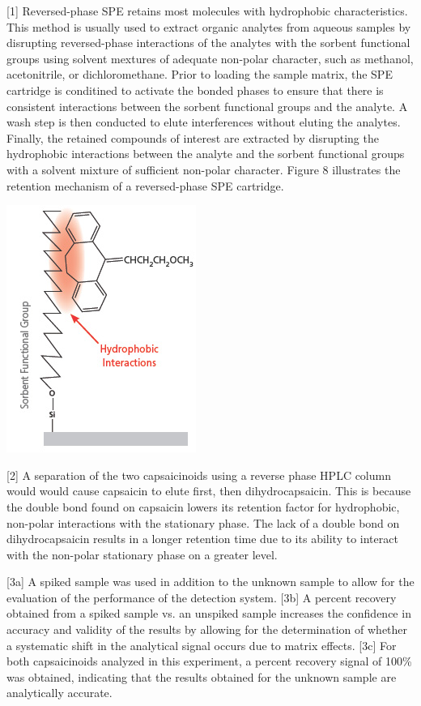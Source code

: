 \documentclass{article}
\begin{document}
\begin{multicols}{2}
{[1] Reversed-phase SPE retains most molecules with hydrophobic characteristics.
This method is usually used to extract organic analytes from aqueous samples by
disrupting reversed-phase interactions of the analytes with the sorbent
functional groups using solvent mextures of adequate non-polar character, such
as methanol, acetonitrile, or dichloromethane.  Prior to loading the sample
matrix, the SPE cartridge is conditined to activate the bonded phases to ensure
that there is consistent interactions between the sorbent functional groups and
the analyte. A wash step is then conducted to elute interferences without
eluting the analytes. Finally, the retained compounds of interest are extracted
by disrupting the hydrophobic interactions between the analyte and the sorbent
functional groups with a solvent mixture of sufficient non-polar character.
Figure 8 illustrates the retention mechanism of a reversed-phase SPE cartridge.
\begin{center}
    \includegraphics[scale=0.4]{spe_cartridge}
\end{center}

[2] A separation of the two capsaicinoids using a reverse phase HPLC column
would would cause capsaicin to elute first, then dihydrocapsaicin. This is
because the double bond found on capsaicin lowers its retention factor for
hydrophobic, non-polar interactions with the stationary phase. The lack of a
double bond on dihydrocapsaicin results in a longer retention time due to its
ability to interact with the non-polar stationary phase on a greater level.

[3a] A spiked sample was used in addition to the unknown sample to allow for the
evaluation of the performance of the detection system. 
[3b] A percent recovery obtained from a spiked sample vs. an unspiked
sample increases the confidence in accuracy and validity of the results by
allowing for the determination of whether a systematic shift in the analytical
signal occurs due to matrix effects.
[3c] For both capsaicinoids analyzed in this experiment, a percent recovery
signal of 100\% was obtained, indicating that the results obtained for the
unknown sample are analytically accurate.

}
\end{multicols}
\end{document}
